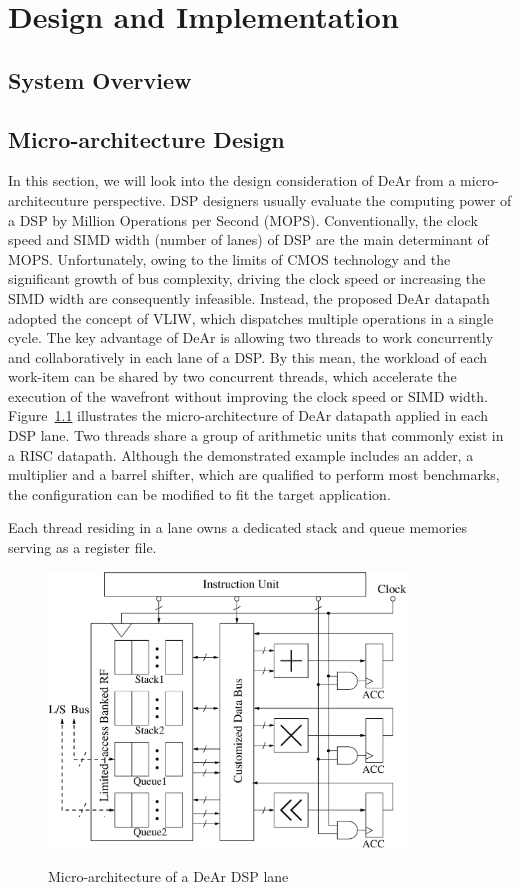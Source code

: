 \chapter{Design and Implementation}
    \section{System Overview}
    \section{Micro-architecture Design}
        In this section, we will look into the design consideration of DeAr from a micro-architecuture perspective.
        DSP designers usually evaluate the computing power of a DSP by Million Operations per Second (MOPS).
        Conventionally, the clock speed and SIMD width (number of lanes) of DSP are the main determinant of MOPS.
        Unfortunately, owing to the limits of CMOS technology and the significant growth of bus complexity, 
        driving the clock speed or increasing the SIMD width are consequently infeasible.
        Instead, the proposed DeAr datapath adopted the concept of VLIW, 
        which dispatches multiple operations in a single cycle.
        The key advantage of DeAr is allowing two threads to work concurrently and collaboratively in each lane of a DSP.
        By this mean, the workload of each work-item can be shared by two concurrent threads, 
        which accelerate the execution of the wavefront without improving the clock speed or SIMD width.
        Figure~\ref{fig:micro} illustrates the micro-architecture of DeAr datapath applied in each DSP lane.
        Two threads share a group of arithmetic units that commonly exist in a RISC datapath.
        Although the demonstrated example includes an adder, a multiplier and a barrel shifter,
        which are qualified to perform most benchmarks,
        the configuration can be modified to fit the target application.
        
        Each thread residing in a lane owns a dedicated stack and queue memories serving as a register file.
        \begin{figure}[!ht] 
            \caption{Micro-architecture of a DeAr DSP lane}
            \centering
            \includegraphics[width=0.85\textwidth]{./figs/micro.eps}
            \label{fig:micro}
        \end{figure}
